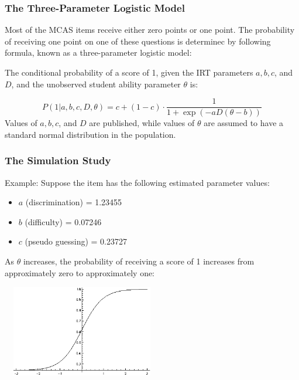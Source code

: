 \documentclass{beamer}
\begin{document}
\begin{frame}
\frametitle{The Three-Parameter Logistic Model}
Most of the MCAS items receive either zero points or one point.  The probability of receiving one point on one of these questions is determinec by following formula, known as a three-parameter logistic model:  
\par\vspace{0.3 cm}
The conditional probability of a score of 1, given the IRT parameters $a,b,c$, and $D$, and the unobserved student ability parameter $\theta$ is:
\par\vspace{0.3 cm}\noindent
\[
P(1|a,b,c,D,\theta) = c+(1-c)\cdot\frac{1}{1+\exp\left(-aD(\theta-b)\right)}
\]
Values of $a,b,c$, and $D$ are published, while values of $\theta$ are assumed to have a standard normal distribution in the population.
\end{frame}

\begin{frame}
\frametitle{The Simulation Study}
Example: Suppose the item has the following estimated parameter values:
\begin{itemize}
\item $a$ (discrimination) = 1.23455
\item $b$ (difficulty)     = 0.07246
\item $c$ (pseudo guessing) = 0.23727
\end{itemize}
\par\vspace{0.3 cm}
As $\theta$ increases, the probability of receiving a score of 1 increases from approximately zero to approximately one:
\vspace{0.5 cm}
\begin{center}
\includegraphics[width=7cm,height=4cm]{NURE2014_fig1.png}
\end{center}
\end{frame}
\end{document}
